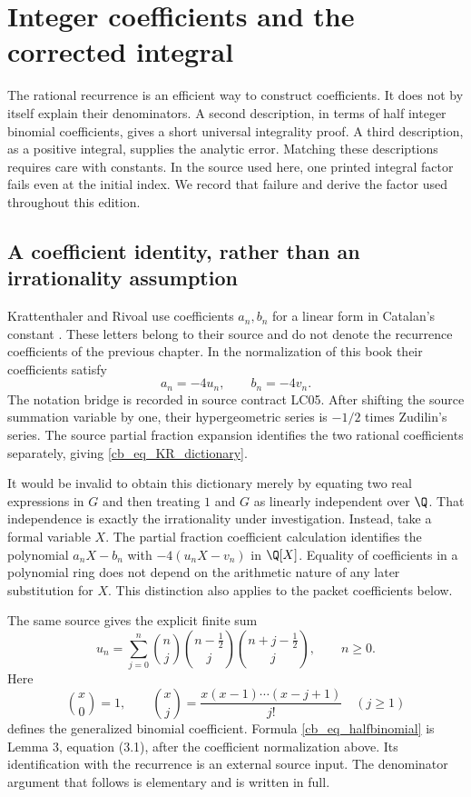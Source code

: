 \chapter{Integer coefficients and the corrected integral}
\label{cb_ch_integrality}

The rational recurrence is an efficient way to construct coefficients. It
does not by itself explain their denominators. A second description, in
terms of half integer binomial coefficients, gives a short universal
integrality proof. A third description, as a positive integral, supplies the
analytic error. Matching these descriptions requires care with constants.
In the source used here, one printed integral factor fails even at the
initial index. We record that failure and derive the factor used throughout
this edition.

\section{A coefficient identity, rather than an irrationality assumption}

Krattenthaler and Rivoal use coefficients $a_n,b_n$ for a linear form in
Catalan's constant \cite{KR2008}. These letters belong to their source and
do not denote the recurrence coefficients of the previous chapter. In the
normalization of this book their coefficients satisfy
\begin{equation}\label{cb_eq_KR_dictionary}
 a_n=-4u_n,\qquad b_n=-4v_n.
\end{equation}
The notation bridge is recorded in source contract LC05. After shifting the
source summation variable by one, their hypergeometric series is $-1/2$
times Zudilin's series. The source partial fraction expansion identifies
the two rational coefficients separately, giving
\eqref{cb_eq_KR_dictionary}.

It would be invalid to obtain this dictionary merely by equating two real
expressions in $G$ and then treating $1$ and $G$ as linearly independent over
$\Q$. That independence is exactly the irrationality under investigation.
Instead, take a formal variable $X$. The partial fraction coefficient
calculation identifies the polynomial $a_nX-b_n$ with
$-4(u_nX-v_n)$ in $\Q[X]$. Equality of coefficients in a polynomial ring
does not depend on the arithmetic nature of any later substitution for
$X$. This distinction also applies to the packet coefficients below.

The same source gives the explicit finite sum
\begin{equation}\label{cb_eq_halfbinomial}
 u_n=\sum_{j=0}^n
 \binom nj\binom{n-\tfrac12}{j}\binom{n+j-\tfrac12}{j},\qquad n\geq0.
\end{equation}
Here
\[
 \binom{x}{0}=1,\qquad
 \binom{x}{j}=\frac{x(x-1)\cdots(x-j+1)}{j!}\quad(j\geq1)
\]
defines the generalized binomial coefficient. Formula
\eqref{cb_eq_halfbinomial} is Lemma 3, equation (3.1), after the coefficient
normalization above. Its identification with the recurrence is an external
source input. The denominator argument that follows is elementary and is
written in full.

